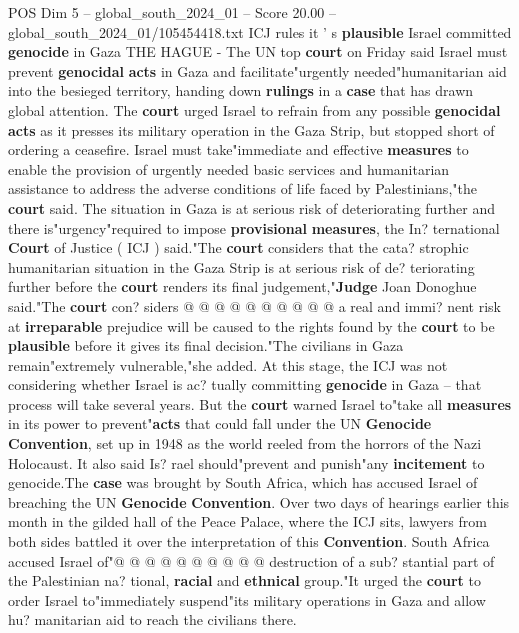 \begin{textsample}{POS Dim 5 – global\_south\_2024\_01 – Score 20.00 – global\_south\_2024\_01/105454418.txt}  \label{ex:f5_pos_020}
ICJ rules it ' s \textbf{plausible} Israel committed \textbf{genocide} in Gaza THE HAGUE - The UN top \textbf{court} on Friday said Israel must prevent \textbf{genocidal} \textbf{acts} in Gaza and facilitate"urgently needed"humanitarian aid into the besieged territory, handing down \textbf{rulings} in a \textbf{case} that has drawn global attention.
The \textbf{court} urged Israel to refrain from any possible \textbf{genocidal} \textbf{acts} as it presses its military operation in the Gaza Strip, but stopped short of ordering a ceasefire.
Israel must take"immediate and effective \textbf{measures} to enable the provision of urgently needed basic services and humanitarian assistance to address the adverse conditions of life faced by Palestinians,"the \textbf{court} said.
The situation in Gaza is at serious risk of deteriorating further and there is"urgency"required to impose \textbf{provisional} \textbf{measures}, the In? ternational \textbf{Court} of Justice ( ICJ ) said."The \textbf{court} considers that the cata? strophic humanitarian situation in the Gaza Strip is at serious risk of de? teriorating further before the \textbf{court} renders its final judgement,"\textbf{Judge} Joan Donoghue said."The \textbf{court} con? siders @ @ @ @ @ @ @ @ @ @ a real and immi? nent risk at \textbf{irreparable} prejudice will be caused to the rights found by the \textbf{court} to be \textbf{plausible} before it gives its final decision."The civilians in Gaza remain"extremely vulnerable,"she added.
At this stage, the ICJ was not considering whether Israel is ac? tually committing \textbf{genocide} in Gaza -- that process will take several years.
But the \textbf{court} warned Israel to"take all \textbf{measures} in its power to prevent"\textbf{acts} that could fall under the UN \textbf{Genocide} \textbf{Convention}, set up in 1948 as the world reeled from the horrors of the Nazi Holocaust.
It also said Is? rael should"prevent and punish"any \textbf{incitement} to genocide.The \textbf{case} was brought by South Africa, which has accused Israel of breaching the UN \textbf{Genocide} \textbf{Convention}.
Over two days of hearings earlier this month in the gilded hall of the Peace Palace, where the ICJ sits, lawyers from both sides battled it over the interpretation of this \textbf{Convention}.
South Africa accused Israel of"@ @ @ @ @ @ @ @ @ @ destruction of a sub? stantial part of the Palestinian na? tional, \textbf{racial} and \textbf{ethnical} group."It urged the \textbf{court} to order Israel to"immediately suspend"its military operations in Gaza and allow hu? manitarian aid to reach the civilians there.

\end{textsample}
